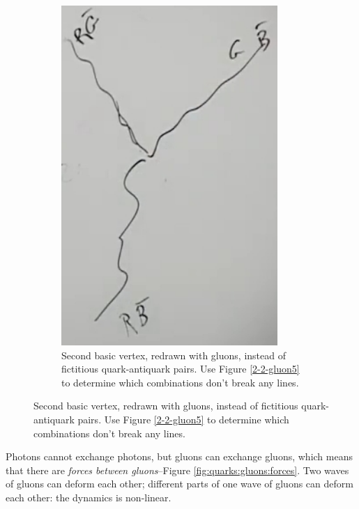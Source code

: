 \documentclass[]{article}
\begin{document}
\begin{figure}[H]
\begin{subfigure}{0.45\textwidth}
	\end{subfigure}
	\begin{subfigure}{0.45\textwidth}
		\caption{Second basic vertex, redrawn with gluons, instead of fictitious quark-antiquark pairs. Use Figure \ref{2-2-gluon5} to determine which combinations don't break any lines.}\label{2-2-gluon6}
		\includegraphics[width=0.9\textwidth]{2-2-gluon6}
	\end{subfigure}
\end{figure}

Photons cannot exchange photons, but gluons can exchange gluons, which means that there are \emph{forces between gluons}--Figure \ref{fig:quarks:gluons:forces}. Two waves of gluons can deform each other; different parts of one wave of gluons can deform each other: the dynamics is non-linear.
\end{document}
